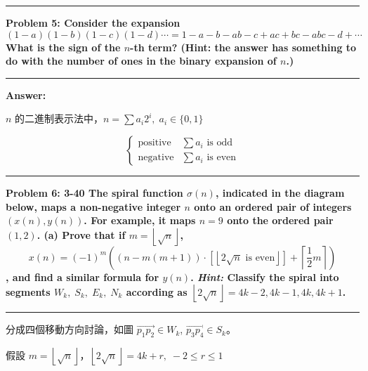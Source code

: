 \documentclass[11pt]{article}
\newcommand\question[2]{\vspace{.25in}\hrule\textbf{#1: #2}\vspace{.5em}\hrule\vspace{.10in}}
\renewcommand\part[1]{\vspace{.10in}\textbf{#1}}
\begin{document}
\question{Problem 5}{Consider the expansion
	$$(1-a)(1-b)(1-c)(1-d) \cdots = 1 - a - b - ab - c + ac + bc - abc - d + \cdots $$
	What is the sign of the $n$-th term? (Hint: the answer has something to do with the number of ones in the binary expansion of $n$.)
}

\part{Answer:}

$n$ 的二進制表示法中，$n = \sum a_i 2^i, \; a_i \in \{0, 1\}$

$$
\begin{cases}
\text{positive} & \sum a_i \text{ is odd} \\
\text{negative} & \sum a_i \text{ is even}
\end{cases}
$$

\question{Problem 6}{3-40 The spiral function $\sigma(n)$, indicated in the diagram below, maps a non-negative integer $n$ onto an ordered pair of integers $(x(n), y(n))$. For example, it maps $n = 9$ onto the ordered pair $(1, 2)$. (a) Prove that if $m = \left \lfloor \sqrt{n} \right \rfloor$, $$x(n) = (-1)^m \left ( (n - m(m+1)) \cdot \left [ \left \lfloor 2 \sqrt{n} \text{ is even}\right \rfloor \right ] + \left \lceil \frac{1}{2} m \right \rceil \right )$$, and find a similar formula for $y(n)$. \textit{Hint:} Classify the spiral into segments $W_k, \; S_k, \; E_k, \; N_k$ according as $\left \lfloor 2 \sqrt{n} \right \rfloor = 4k - 2, 4k - 1, 4k, 4k+1$.
}

分成四個移動方向討論，如圖 $\overrightarrow{p_1 p_2} \in W_k$, $\overrightarrow{p_3 p_4} \in S_k$。

假設 $m = \left \lfloor \sqrt{n} \right \rfloor$，$\left \lfloor 2 \sqrt{n} \right \rfloor = 4k + r, \; -2 \le r \le 1$
\end{document}
